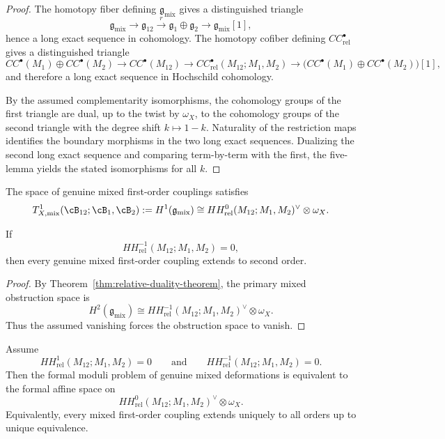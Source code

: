 \begin{proof}
The homotopy fiber defining $\mathfrak g_{\mathrm{mix}}$ gives a distinguished triangle
\[
\mathfrak g_{\mathrm{mix}} \to \mathfrak g_{12} \xrightarrow{r} \mathfrak g_1\oplus \mathfrak g_2 \to \mathfrak g_{\mathrm{mix}}[1],
\]
hence a long exact sequence in cohomology.  The homotopy cofiber defining $CC^\bullet_{\mathrm{rel}}$ gives a distinguished triangle
\[
CC^\bullet(M_1)\oplus CC^\bullet(M_2)
\to CC^\bullet(M_{12})
\to CC^\bullet_{\mathrm{rel}}(M_{12};M_1,M_2)
\to
\big(CC^\bullet(M_1)\oplus CC^\bullet(M_2)\big)[1],
\]
and therefore a long exact sequence in Hochschild cohomology.

By the assumed complementarity isomorphisms, the cohomology groups of the first triangle are dual, up to the twist by $\omega_X$, to the cohomology groups of the second triangle with the degree shift $k\mapsto 1-k$.  Naturality of the restriction maps identifies the boundary morphisms in the two long exact sequences.  Dualizing the second long exact sequence and comparing term-by-term with the first, the five-lemma yields the stated isomorphisms for all $k$.
\end{proof}

\begin{corollary}
\label{cor:relative-tangent-center-principle}
The space of genuine mixed first-order couplings satisfies
\[
T^1_{X,\mathrm{mix}}(\cB_{12};\cB_1,\cB_2)
:= H^1(\mathfrak g_{\mathrm{mix}})
\cong
HH^{0}_{\mathrm{rel}}(M_{12};M_1,M_2)^\vee\otimes \omega_X.
\]
\end{corollary}

\begin{corollary}
\label{cor:relative-dual-unobstructedness}
If
\[
HH^{-1}_{\mathrm{rel}}(M_{12};M_1,M_2)=0,
\]
then every genuine mixed first-order coupling extends to second order.
\end{corollary}

\begin{proof}
By Theorem~\ref{thm:relative-duality-theorem}, the primary mixed obstruction space is
\[
H^2(\mathfrak g_{\mathrm{mix}})
\cong
HH^{-1}_{\mathrm{rel}}(M_{12};M_1,M_2)^\vee\otimes \omega_X.
\]
Thus the assumed vanishing forces the obstruction space to vanish.
\end{proof}

\begin{theorem}
\label{thm:relative-central-formality}
Assume
\[
HH^{1}_{\mathrm{rel}}(M_{12};M_1,M_2)=0
\qquad\text{and}\qquad
HH^{-1}_{\mathrm{rel}}(M_{12};M_1,M_2)=0.
\]
Then the formal moduli problem of genuine mixed deformations is equivalent to the formal affine space on
\[
HH^{0}_{\mathrm{rel}}(M_{12};M_1,M_2)^\vee\otimes \omega_X.
\]
Equivalently, every mixed first-order coupling extends uniquely to all orders up to unique equivalence.
\end{theorem}

